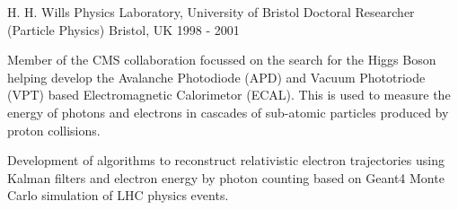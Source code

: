 \begin{cventries}
\cventry
{H. H. Wills Physics Laboratory, University of Bristol} %
{Doctoral Researcher (Particle Physics)} %
{Bristol, UK} %
{1998 - 2001} %
{
  \begin{cvitems} %
    \item {
        Member of the CMS collaboration focussed on the search for the Higgs Boson
        helping develop the Avalanche Photodiode (APD) and Vacuum Phototriode (VPT) 
        based Electromagnetic Calorimetor (ECAL). This is used to measure the energy 
        of photons and electrons in cascades of sub-atomic particles produced by 
        proton collisions.}
      \item {
        Development of algorithms to reconstruct relativistic electron trajectories 
        using Kalman filters and electron energy by photon counting based on Geant4 
        Monte Carlo simulation of LHC physics events.}
  \end{cvitems}
}

\end{cventries}